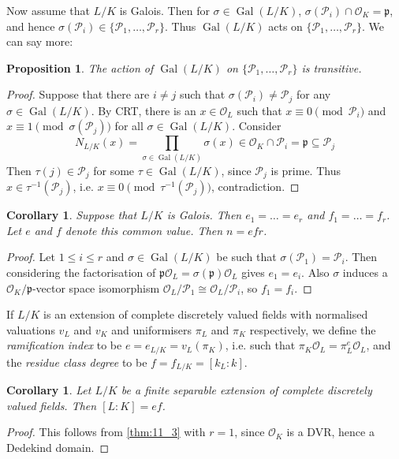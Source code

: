 \documentclass[11pt]{article}
\theoremstyle{definition}
\theoremstyle{plain}
\newtheorem{proposition}[definition]{Proposition}
\newtheorem{corollary}[definition]{Corollary}
\theoremstyle{remark}
\DeclareMathOperator{\Gal}{Gal}
\newcommand{\cO}{\mathcal{O}}
\newcommand{\cP}{\mathcal{P}}
\newcommand{\fp}{\mathfrak{p}}
\begin{document}
Now assume that $L / K$ is Galois. Then for $\sigma \in \Gal(L / K)$, $\sigma(\cP_i) \cap \cO_K = \fp$, and hence $\sigma(\cP_i) \in \{\cP_1, \ldots, \cP_r\}$. Thus $\Gal(L / K)$ acts on $\{\cP_1, \ldots, \cP_r\}$. We can say more:

\begin{proposition}\label{prop:11_4}
    The action of $\Gal(L / K)$ on $\{\cP_1, \ldots, \cP_r\}$ is transitive.
\end{proposition}
\begin{proof}
    Suppose that there are $i \neq j$ such that $\sigma(\cP_i) \neq \cP_j$ for any $\sigma \in \Gal(L / K)$. By CRT, there is an $x \in \cO_L$ such that $x \equiv 0 \pmod{\cP_i}$ and $x \equiv 1 \pmod{\sigma(\cP_j)}$ for all $\sigma \in \Gal(L/K)$. Consider
    \begin{equation*}
        N_{L/K}(x) = \prod_{\sigma \in \Gal(L/K)} \sigma(x) \in \cO_K \cap \cP_i = \fp \subseteq \cP_j
    \end{equation*}
    Then $\tau(j) \in \cP_j$ for some $\tau \in \Gal(L/K)$, since $\cP_j$ is prime. Thus $x \in \tau^{-1}(\cP_j)$, i.e. $x \equiv 0 \pmod{\tau^{-1}(\cP_j)}$, contradiction.
\end{proof}

\begin{corollary}\label{cor:11_5}
    Suppose that $L/K$ is Galois. Then $e_1 = \ldots = e_r$ and $f_1 = \ldots = f_r$. Let $e$ and $f$ denote this common value. Then $n = e f r$.
\end{corollary}
\begin{proof}
    Let $1 \le i \le r$ and $\sigma \in \Gal(L/K)$ be such that $\sigma(\cP_1) = \cP_i$. Then considering the factorisation of $\fp \cO_L = \sigma(\fp) \cO_L$ gives $e_1 = e_i$. Also $\sigma$ induces a $\cO_K / \fp$-vector space isomorphism $\cO_L / \cP_1 \cong \cO_L / \cP_i$, so $f_1 = f_i$.
\end{proof}

If $L / K$ is an extension of complete discretely valued fields with normalised valuations $v_L$ and $v_K$ and uniformisers $\pi_L$ and $\pi_K$ respectively, we define the \emph{ramification index} to be $e = e_{L/K} = v_L(\pi_K)$, i.e. such that $\pi_K \cO_L = \pi_L^e \cO_L$, and the \emph{residue class degree} to be $f = f_{L/K} = [k_L : k]$.

\begin{corollary}\label{cor:11_6}
    Let $L/K$ be a finite separable extension of complete discretely valued fields. Then $[L : K] = e f$.
\end{corollary}
\begin{proof}
    This follows from \autoref{thm:11_3} with $r = 1$, since $\cO_K$ is a DVR, hence a Dedekind domain.
\end{proof}
\end{document}
